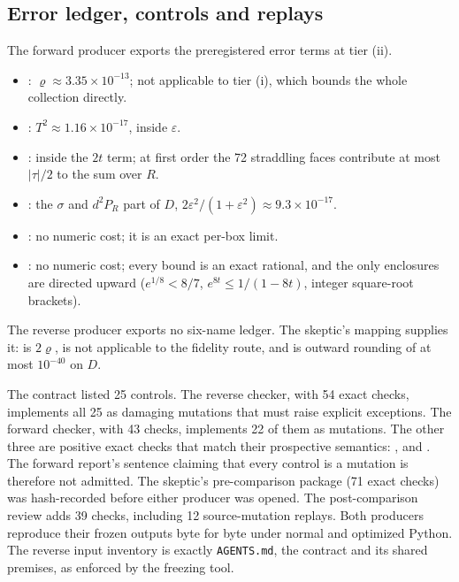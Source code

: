 \subsection{Error ledger, controls and replays}
\label{sec:av1-evidence}
The forward producer exports the preregistered error terms at tier (ii).
\begin{itemize}
\item {}: $\varrho\approx3.35\times10^{-13}$; not
applicable to tier (i), which bounds the whole collection directly.
\item {}: $T^2\approx1.16\times10^{-17}$, inside
$\varepsilon$.
\item {}: inside the $2t$ term; at first order the 72
straddling faces contribute at most $|\tau|/2$ to the sum over $R$.
\item {}: the $\sigma$ and $d^2P_R$ part of $D$,
$2\varepsilon^2/(1+\varepsilon^2)\approx9.3\times10^{-17}$.
\item {}: no numeric cost; it is an exact
per-box limit.
\item {}: no numeric cost; every bound is an exact
rational, and the only enclosures are directed upward
($e^{1/8}<8/7$, $e^{8t}\le1/(1-8t)$, integer square-root brackets).
\end{itemize}
The reverse producer exports no six-name ledger. The skeptic's mapping
supplies it:  is $2\varrho$,  is not
applicable to the fidelity route, and  is outward rounding
of at most $10^{-40}$ on $D$.

The contract listed 25 controls. The reverse checker, with 54 exact checks,
implements all 25 as damaging mutations that must raise explicit exceptions.
The forward checker, with 43 checks, implements 22 of them as mutations. The
other three are positive exact checks that match their prospective semantics:
,
 and
. The forward report's sentence claiming
that every control is a mutation is therefore not admitted. The skeptic's
pre-comparison package (71 exact checks) was hash-recorded before either
producer was opened. The post-comparison review adds 39 checks, including 12
source-mutation replays. Both producers reproduce their frozen outputs byte
for byte under normal and optimized Python. The reverse input inventory is
exactly \texttt{AGENTS.md}, the contract and its shared premises, as enforced
by the freezing tool.

